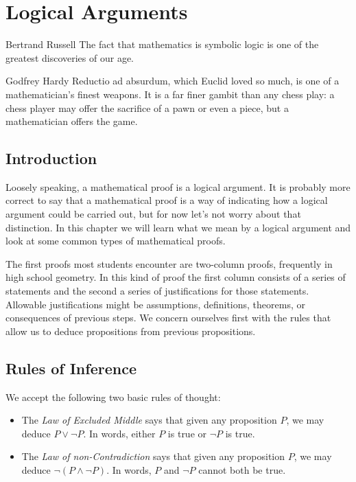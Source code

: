 \chapter{Logical Arguments}

\begin{chapqt}{Bertrand Russell}
The fact that mathematics is symbolic logic is one of the greatest discoveries of our age.
\end{chapqt}

\begin{chapqt}{Godfrey Hardy}
Reductio ad absurdum, which Euclid loved so much, is one of a mathematician's finest weapons. It is a far finer gambit than any chess play: a chess player may offer the sacrifice of a pawn or even a piece, but a mathematician offers the game.
\end{chapqt}

\section*{Introduction}

Loosely speaking, a mathematical proof is a logical argument. It is probably more correct to say that a mathematical proof is a way of indicating how a logical argument could be carried out, but for now let's not worry about that distinction. In this chapter we will learn what we mean by a logical argument and look at some common types of mathematical proofs.

The first proofs most students encounter are two-column proofs, frequently in high school geometry. In this kind of proof the first column consists of a series of statements and the second a series of justifications for those statements. Allowable justifications might be assumptions, definitions, theorems, or consequences of previous steps. We concern ourselves first with the rules that allow us to deduce propositions from previous propositions. 

\section{Rules of Inference} 

We accept the following two basic rules of thought:
\begin{itemize}
\item[] The \emph{Law of Excluded Middle} says that given any proposition $P$, we may deduce $P\lor \neg P$. In words, either $P$ is true or $\neg P$ is true.
\item[] The \emph{Law of non-Contradiction} says that given any proposition $P$, we may deduce $\neg(P\land\neg P)$. In words, $P$ and $\neg P$ cannot both be true.
\end{itemize}

